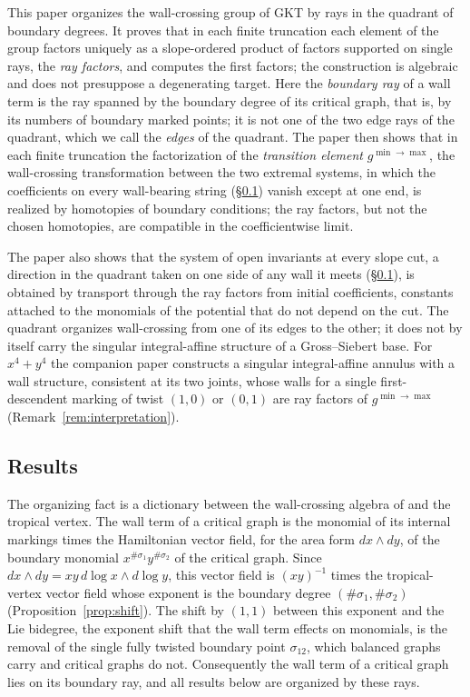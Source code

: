 \documentclass[11pt]{amsart}
\theoremstyle{definition}
\theoremstyle{remark}
\begin{document}
This paper organizes the wall-crossing group of GKT by rays in the
quadrant of boundary degrees.  It proves that in each finite truncation each element of the
group factors uniquely as a slope-ordered product of factors supported on
single rays, the \emph{ray factors}, and computes the first factors; the
construction is algebraic and does not presuppose a degenerating target.  Here
the \emph{boundary ray} of a wall term is the ray spanned by the boundary
degree of its critical graph, that is, by its numbers of boundary marked
points; it is not one of the two edge rays of the quadrant, which we call
the \emph{edges} of the quadrant.  The paper then shows that in each finite
truncation the factorization of the \emph{transition element}
$g^{\min\to\max}$, the wall-crossing transformation between the two extremal
systems, in which the coefficients on every wall-bearing string
(\S\ref{ssec:results}) vanish except at one end, is realized by homotopies of
boundary conditions; the ray factors, but not the chosen homotopies, are
compatible in the coefficientwise limit.

The paper also shows that the system of
open invariants at every slope cut, a direction in the quadrant taken on one
side of any wall it meets (\S\ref{ssec:results}), is obtained by transport
through the ray factors from initial coefficients, constants attached to the
monomials of the potential that do not depend on the cut.  The quadrant organizes
wall-crossing from one of its edges to the other; it does not by itself carry
the singular integral-affine structure of a Gross--Siebert base.  For
$x^4+y^4$ the companion paper \cite{annular} constructs a singular
integral-affine annulus with a wall structure, consistent at its two joints,
whose walls for a single first-descendent marking of twist $(1,0)$ or $(0,1)$
are ray factors of $g^{\min\to\max}$ (Remark~\ref{rem:interpretation}).

\subsection{Results}
\label{ssec:results}
The organizing fact is a dictionary between the wall-crossing algebra of
\cite{GKT} and the tropical vertex.  The wall term of a critical graph is the
monomial of its internal markings times the Hamiltonian vector field, for the
area form $dx\wedge dy$, of the boundary monomial $x^{\#\sigma_1}y^{\#\sigma_2}$
of the critical graph.  Since $dx\wedge dy=xy\,d\log x\wedge d\log y$, this
vector field is $(xy)^{-1}$ times the tropical-vertex vector field whose
exponent is the boundary degree
$(\#\sigma_1,\#\sigma_2)$ (Proposition~\ref{prop:shift}).  The shift
by $(1,1)$ between this exponent and the Lie bidegree, the exponent shift that
the wall term effects on monomials, is the removal of the
single fully twisted boundary point $\sigma_{12}$, which balanced graphs carry
and critical graphs do not.  Consequently the wall term of a critical graph lies
on its boundary ray, and all results below are organized by these rays.
\end{document}
